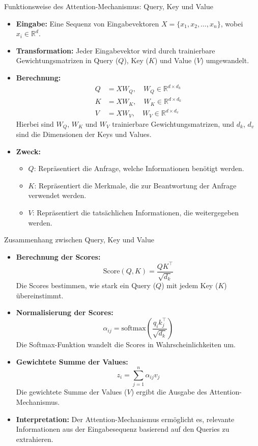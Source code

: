 \documentclass[aspectratio=1610, xcolor=dvipsnames, 9pt]{beamer}
\begin{document}
\begin{frame}{Funktionsweise des Attention-Mechanismus: Query, Key und Value}
  \begin{itemize}
    \item \textbf{Eingabe:} Eine Sequenz von Eingabevektoren \( X = \{x_1, x_2, \dots, x_n\} \), wobei \( x_i \in \mathbb{R}^d \).
    \item \textbf{Transformation:} Jeder Eingabevektor wird durch trainierbare Gewichtungsmatrizen in Query (\( Q \)), Key (\( K \)) und Value (\( V \)) umgewandelt.
    \item \textbf{Berechnung:}
      \begin{align*}
        Q &= XW_Q, \quad W_Q \in \mathbb{R}^{d \times d_k} \\
        K &= XW_K, \quad W_K \in \mathbb{R}^{d \times d_k} \\
        V &= XW_V, \quad W_V \in \mathbb{R}^{d \times d_v}
      \end{align*}
      Hierbei sind \( W_Q \), \( W_K \) und \( W_V \) trainierbare Gewichtungsmatrizen, und \( d_k \), \( d_v \) sind die Dimensionen der Keys und Values.
    \item \textbf{Zweck:}
      \begin{itemize}
        \item \( Q \): Repräsentiert die Anfrage, welche Informationen benötigt werden.
        \item \( K \): Repräsentiert die Merkmale, die zur Beantwortung der Anfrage verwendet werden.
        \item \( V \): Repräsentiert die tatsächlichen Informationen, die weitergegeben werden.
      \end{itemize}
  \end{itemize}
\end{frame}

\begin{frame}{Zusammenhang zwischen Query, Key und Value}
  \begin{itemize}
    \item \textbf{Berechnung der Scores:}
      \[
      \text{Score}(Q, K) = \frac{QK^\top}{\sqrt{d_k}}
      \]
      Die Scores bestimmen, wie stark ein Query (\( Q \)) mit jedem Key (\( K \)) übereinstimmt.
    \item \textbf{Normalisierung der Scores:}
      \[
      \alpha_{ij} = \text{softmax}\left(\frac{q_i k_j^\top}{\sqrt{d_k}}\right)
      \]
      Die Softmax-Funktion wandelt die Scores in Wahrscheinlichkeiten um.
    \item \textbf{Gewichtete Summe der Values:}
      \[
      z_i = \sum_{j=1}^n \alpha_{ij} v_j
      \]
      Die gewichtete Summe der Values (\( V \)) ergibt die Ausgabe des Attention-Mechanismus.
    \item \textbf{Interpretation:} Der Attention-Mechanismus ermöglicht es, relevante Informationen aus der Eingabesequenz basierend auf den Queries zu extrahieren.
  \end{itemize}
\end{frame}
\end{document}
